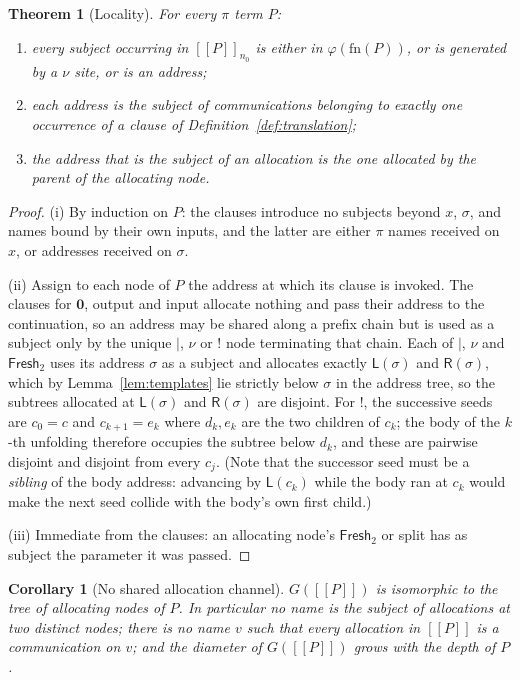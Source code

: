 \documentclass[11pt]{article}
\theoremstyle{definition}
\theoremstyle{plain}
\newtheorem{theorem}[definition]{Theorem}
\newtheorem{corollary}[definition]{Corollary}
\theoremstyle{remark}
\newcommand{\enc}[1]{[\![#1]\!]}
\newcommand{\nil}{\mathbf{0}}
\newcommand{\Lft}{\mathsf{L}}
\newcommand{\Rgt}{\mathsf{R}}
\newcommand{\Frsh}{\mathsf{Fresh}_2}
\newcommand{\fn}{\mathrm{fn}}
\begin{document}
\begin{theorem}[Locality]\label{thm:locality}
For every $\pi$ term $P$:
\begin{enumerate}[label=(\roman*),leftmargin=2.2em,nosep]
\item every subject occurring in $\enc{P}_{n_0}$ is either in
$\varphi(\fn(P))$, or is generated by a $\nu$ site, or is an address;
\item each address is the subject of communications belonging to exactly
one occurrence of a clause of Definition~\ref{def:translation};
\item the address that is the subject of an allocation is the one
allocated by the parent of the allocating node.
\end{enumerate}
\end{theorem}

\begin{proof}
(i) By induction on $P$: the clauses introduce no subjects beyond $x$,
$\sigma$, and names bound by their own inputs, and the latter are either
$\pi$ names received on $x$, or addresses received on $\sigma$.

(ii) Assign to each node of $P$ the address at which its clause is
invoked. The clauses for $\nil$, output and input allocate nothing and
pass their address to the continuation, so an address may be shared along
a prefix chain but is used as a subject only by the unique $\mid$, $\nu$
or $!$ node terminating that chain. Each of $\mid$, $\nu$ and $\Frsh$
uses its address $\sigma$ as a subject and allocates exactly
$\Lft(\sigma)$ and $\Rgt(\sigma)$, which by Lemma~\ref{lem:templates} lie
strictly below $\sigma$ in the address tree, so the subtrees allocated at
$\Lft(\sigma)$ and $\Rgt(\sigma)$ are disjoint. For $!$, the successive
seeds are $c_0 = c$ and $c_{k+1} = e_k$ where $d_k, e_k$ are the two
children of $c_k$; the body of the $k$-th unfolding therefore occupies the
subtree below $d_k$, and these are pairwise disjoint and disjoint from
every $c_j$. (Note that the successor seed must be a \emph{sibling} of
the body address: advancing by $\Lft(c_k)$ while the body ran at $c_k$
would make the next seed collide with the body's own first child.)

(iii) Immediate from the clauses: an allocating node's $\Frsh$ or split
has as subject the parameter it was passed.
\end{proof}

\begin{corollary}[No shared allocation channel]\label{cor:noserver}
$G(\enc{P})$ is isomorphic to the tree of allocating nodes of $P$. In
particular no name is the subject of allocations at two distinct nodes;
there is no name $v$ such that every allocation in $\enc{P}$ is a
communication on $v$; and the diameter of $G(\enc{P})$ grows with the
depth of $P$.
\end{corollary}
\end{document}
